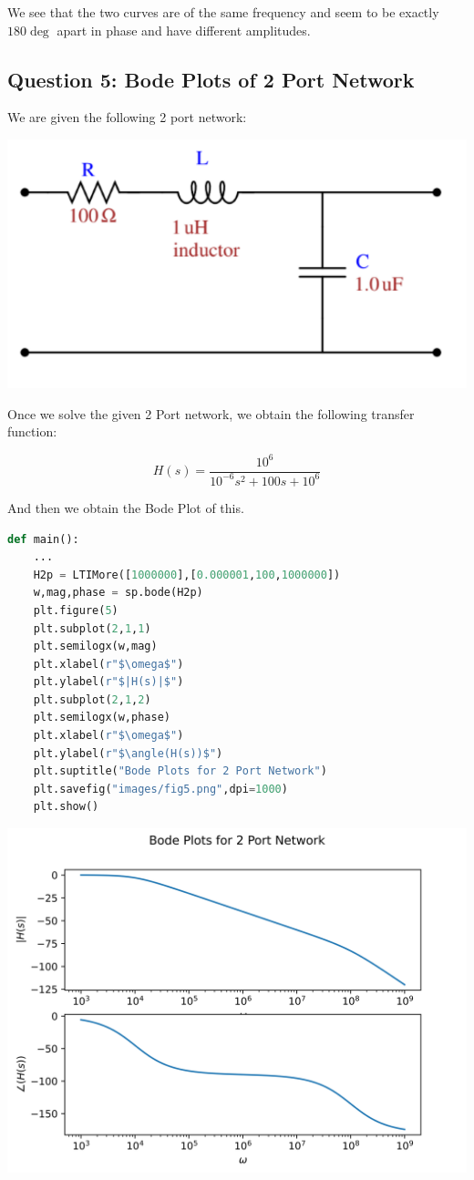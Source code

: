 \documentclass[12pt]{article}
\begin{document}
We see that the two curves are of the same frequency and seem to be exactly $180 \deg$ apart in phase and have different amplitudes.

\pagebreak
\subsection{Question 5: Bode Plots of 2 Port Network}
We are given the following 2 port network:

\begin{center}
    \includegraphics[scale=0.8]{RLC.png}
\end{center}

Once we solve the given 2 Port network, we obtain the following transfer function:

$$H(s) = \frac{10^6}{10^{-6} s^2 + 100 s + 10^6}$$

And then we obtain the Bode Plot of this.

\begin{lstlisting}[language=Python]
def main():
    ...
    H2p = LTIMore([1000000],[0.000001,100,1000000])
    w,mag,phase = sp.bode(H2p)
    plt.figure(5)
    plt.subplot(2,1,1)
    plt.semilogx(w,mag)
    plt.xlabel(r"$\omega$")
    plt.ylabel(r"$|H(s)|$")
    plt.subplot(2,1,2)
    plt.semilogx(w,phase)
    plt.xlabel(r"$\omega$")
    plt.ylabel(r"$\angle(H(s))$")
    plt.suptitle("Bode Plots for 2 Port Network")
    plt.savefig("images/fig5.png",dpi=1000)
    plt.show()
\end{lstlisting}

\begin{center}
    \includegraphics[scale=1]{images/fig5.png}
\end{center}
\pagebreak
\end{document}
